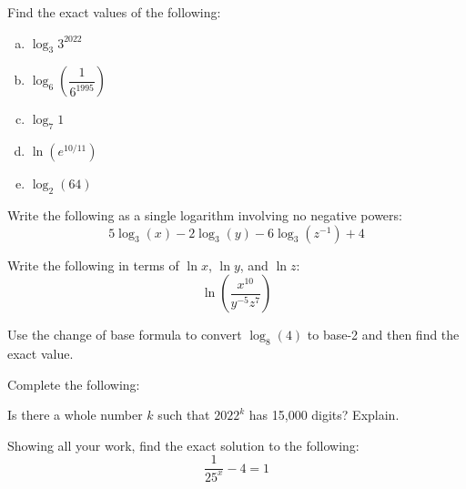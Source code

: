 \documentclass[12pt,letterpaper]{exam}
\begin{document}
\begin{questions}
\newpage
\question[10] Find the exact values of the following: \pspace

\begin{enumerate}[(a)]
\item $\log_3 3^{2022}$ \vfill

\item $\log_6 \left( \dfrac{1}{6^{1995}} \right)$ \vfill

\item $\log_7 1$ \vfill

\item $\ln(e^{10/11})$ \vfill

\item $\log_2(64)$ \vfill
\end{enumerate}



\newpage
\question[10] Write the following as a single logarithm involving no negative powers:
	\[
	5 \log_3(x) - 2 \log_3(y) - 6 \log_3(z^{-1}) + 4
	\]



\newpage
\question[10] Write the following in terms of $\ln x$, $\ln y$, and $\ln z$:
	\[
	\ln \left( \dfrac{x^{10}}{y^{-5} z^7} \right)
	\]



\newpage
\question[10] Use the change of base formula to convert $\log_8(4)$ to base-2 and then find the exact value. 



\newpage
\question Complete the following:




\newpage
\question[10] Is there a whole number $k$ such that $2022^k$ has 15,000 digits? Explain.



\newpage
\question[10] Showing all your work, find the exact solution to the following: 
	\[
	\dfrac{1}{25^x} - 4= 1
	\]




\end{questions}
\end{document}
